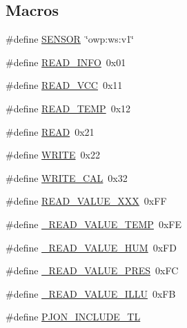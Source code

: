 \subsection*{Macros}
\begin{DoxyCompactItemize}
\item 
\#define \hyperlink{OWP__DG__GPS__WeatherStation_8ino_a84f1ead330bbcc83a63929c4726080d7}{S\-E\-N\-S\-O\-R}~\char`\"{}owp\-:ws\-:v1\char`\"{}
\item 
\#define \hyperlink{OWP__DG__GPS__WeatherStation_8ino_ae9d85efda88bdfdba5ca9fe92f557dd9}{R\-E\-A\-D\-\_\-\-I\-N\-F\-O}~0x01
\item 
\#define \hyperlink{OWP__DG__GPS__WeatherStation_8ino_a3563b296d5f60635a1256e8a12261d74}{R\-E\-A\-D\-\_\-\-V\-C\-C}~0x11
\item 
\#define \hyperlink{OWP__DG__GPS__WeatherStation_8ino_ac8c23082885adeec4834469b64e00bb9}{R\-E\-A\-D\-\_\-\-T\-E\-M\-P}~0x12
\item 
\#define \hyperlink{OWP__DG__GPS__WeatherStation_8ino_ada74e7db007a68e763f20c17f2985356}{R\-E\-A\-D}~0x21
\item 
\#define \hyperlink{OWP__DG__GPS__WeatherStation_8ino_aa10f470e996d0f51210d24f442d25e1e}{W\-R\-I\-T\-E}~0x22
\item 
\#define \hyperlink{OWP__DG__GPS__WeatherStation_8ino_a9418b096dba157494f523dc01b82a760}{W\-R\-I\-T\-E\-\_\-\-C\-A\-L}~0x32
\item 
\#define \hyperlink{OWP__DG__GPS__WeatherStation_8ino_af12022724a30608d5904c0821531d798}{R\-E\-A\-D\-\_\-\-V\-A\-L\-U\-E\-\_\-\-X\-X\-X}~0x\-F\-F
\item 
\#define \hyperlink{OWP__DG__GPS__WeatherStation_8ino_a122352b1f649325157c324dfce67f012}{\-\_\-\-R\-E\-A\-D\-\_\-\-V\-A\-L\-U\-E\-\_\-\-T\-E\-M\-P}~0x\-F\-E
\item 
\#define \hyperlink{OWP__DG__GPS__WeatherStation_8ino_a06680f58811d8e62bc6cb33810199fda}{\-\_\-\-R\-E\-A\-D\-\_\-\-V\-A\-L\-U\-E\-\_\-\-H\-U\-M}~0x\-F\-D
\item 
\#define \hyperlink{OWP__DG__GPS__WeatherStation_8ino_aed61342a5c1e3abd11d9cd471a428792}{\-\_\-\-R\-E\-A\-D\-\_\-\-V\-A\-L\-U\-E\-\_\-\-P\-R\-E\-S}~0x\-F\-C
\item 
\#define \hyperlink{OWP__DG__GPS__WeatherStation_8ino_ae5653bac0d4c4a230cf21f8bf729d329}{\-\_\-\-R\-E\-A\-D\-\_\-\-V\-A\-L\-U\-E\-\_\-\-I\-L\-L\-U}~0x\-F\-B
\item 
\#define \hyperlink{OWP__DG__GPS__WeatherStation_8ino_aeebf956fc71944a6237c3af6a038ff70}{P\-J\-O\-N\-\_\-\-I\-N\-C\-L\-U\-D\-E\-\_\-\-T\-L}
\end{DoxyCompactItemize}
